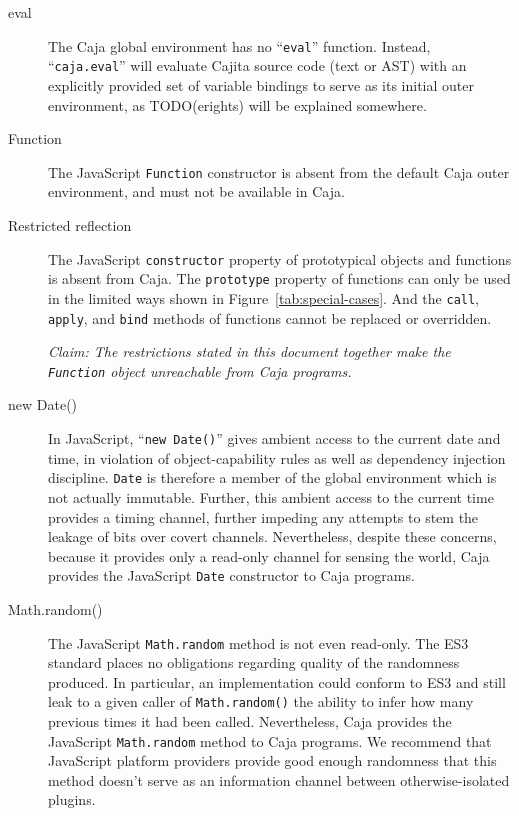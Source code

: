 \documentclass[letterpaper,twocolumn,10pt]{article}
\newcommand{\code}[1]{{\tt {#1}}}              %
\begin{document}
\begin{description}

    \item[eval] The Caja global environment has no ``\code{eval}'' function. 
    Instead, ``\code{caja.eval}'' will evaluate Cajita source code (text or 
    AST) with an explicitly provided set of variable bindings to serve as its 
    initial outer environment, as TODO(erights) will be explained somewhere.
    
    \item[Function] The JavaScript \code{Function} constructor is absent from 
    the default Caja outer environment, and must not be available in Caja.
    
    \item[Restricted reflection] The JavaScript \code{constructor} property of 
    prototypical objects and functions is absent from Caja. The \code{prototype} property of functions can only be
    used in the limited ways shown in Figure~\ref{tab:special-cases}. And the \code{call}, \code{apply}, and
    \code{bind} methods of functions cannot be replaced or overridden.
    
    \emph{Claim: The restrictions stated in this document together make the 
    \code{Function} object unreachable from Caja programs.}

    \item[new Date()] In JavaScript, ``\code{new Date()}''  gives ambient 
    access to the current date and time, in violation of object-capability 
    rules as well as dependency injection discipline. \code{Date} is 
    therefore a member of the global environment which is not actually 
    immutable. Further, this ambient access to the current time provides a 
    timing channel, further impeding any attempts to stem the leakage of bits 
    over covert channels. Nevertheless, despite these concerns, because it 
    provides only a read-only channel for sensing the world, Caja provides 
    the JavaScript \code{Date} constructor to Caja programs.

    \item[Math.random()] The JavaScript \code{Math.random} method is not even 
    read-only. The ES3 standard places no obligations regarding quality of the
    randomness produced. In particular, an implementation could conform to ES3
    and still leak to a given caller of \code{Math.random()} the ability to
    infer how many previous times it had been called. Nevertheless, Caja
    provides the JavaScript \code{Math.random} method to Caja programs. We
    recommend that JavaScript platform providers provide good enough
    randomness that this method doesn't serve as an information channel
    between otherwise-isolated plugins.
    
\end{description}
\end{document}
